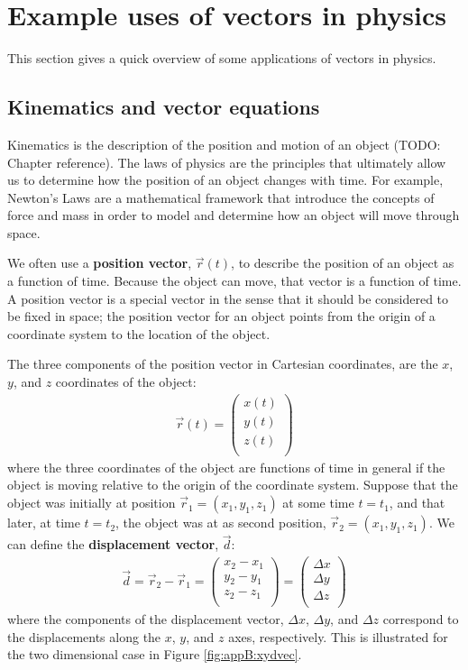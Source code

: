 \section{Example uses of vectors in physics}
This section gives a quick overview of some applications of vectors in physics.
\subsection{Kinematics and vector equations}
Kinematics is the description of the position and motion of an object (TODO: Chapter reference). The laws of physics are the principles that ultimately allow us to determine how the position of an object changes with time. For example, Newton's Laws are a mathematical framework that introduce the concepts of force and mass in order to model and determine how an object will move through space.

We often use a \textbf{position vector}, $\vec r(t)$, to describe the position of an object as a function of time. Because the object can move, that vector is a function of time. A position vector is a special vector in the sense that it should be considered to be fixed in space; the position vector for an object points from the origin of a coordinate system to the location of the object. 

The three components of the position vector in Cartesian coordinates, are the $x$, $y$, and $z$ coordinates of the object:
\begin{align*}
\vec r(t) = \begin{pmatrix}
           x(t) \\
           y(t) \\
           z(t) \\
         \end{pmatrix}
\end{align*}  
where the three coordinates of the object are functions of time in general if the object is moving relative to the origin of the coordinate system. Suppose that the object was initially at position $\vec r_1=(x_1, y_1, z_1)$ at some time $t=t_1$, and that later, at time $t=t_2$, the object was at as second position, $\vec r_2=(x_1, y_1, z_1)$. We can define the \textbf{displacement vector}, $\vec  d$:
\begin{align*}
 \vec d = \vec r_2 - \vec r_1 =\begin{pmatrix}
           x_2-x_1 \\
           y_2-y_1 \\
           z_2-z_1 \\
         \end{pmatrix} = \begin{pmatrix}
           \Delta x \\
           \Delta y \\
           \Delta z \\
         \end{pmatrix}
\end{align*}
where the components of the displacement vector, $\Delta x$, $\Delta y$, and $\Delta z$ correspond to the displacements along the $x$, $y$, and $z$ axes, respectively. This is illustrated for the two dimensional case in Figure \ref{fig:appB:xydvec}.

